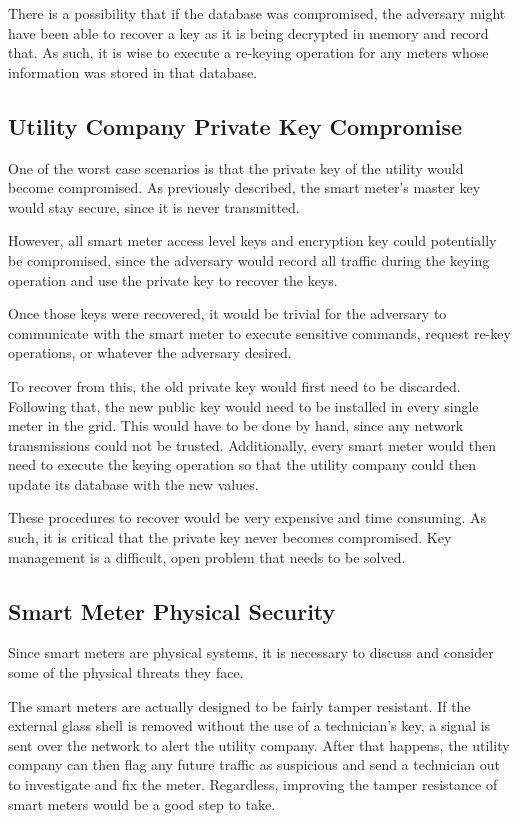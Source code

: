 There is a possibility that if the database was compromised, the adversary might have been able to recover a key
as it is being decrypted in memory and record that. As such, it is wise to execute a re-keying operation for any meters
whose information was stored in that database.

\subsection{Utility Company Private Key Compromise}
One of the worst case scenarios is that the private key of the utility would become compromised. As previously
described, the smart meter's master key would stay secure, since it is never transmitted.

However, all smart meter access level keys and encryption key could potentially be compromised, since the adversary
would record all traffic during the keying operation and use the private key to recover the keys.

Once those keys were recovered, it would be trivial for the adversary to communicate with the smart meter to
execute sensitive commands, request re-key operations, or whatever the adversary desired.

To recover from this, the old private key would first need to be discarded. Following that, the new public key would
need to be installed in every single meter in the grid. This would have to be done by hand, since any network
transmissions could not be trusted. Additionally, every smart meter would then need to execute the keying operation
so that the utility company could then update its database with the new values.

These procedures to recover would be very expensive and time consuming. As such, it is critical that the private key
never becomes compromised. Key management is a difficult, open problem that needs to be solved.

\subsection{Smart Meter Physical Security}
Since smart meters are physical systems, it is necessary to discuss and consider some of the physical threats they face.

The smart meters are actually designed to be fairly tamper resistant. If the external glass shell is removed without the
use of a technician's key, a signal is sent over the network to alert the utility company. After that happens, the utility
company can then flag any future traffic as suspicious and send a technician out to investigate and fix the meter.
Regardless, improving the tamper resistance of smart meters would be a good step to take.

